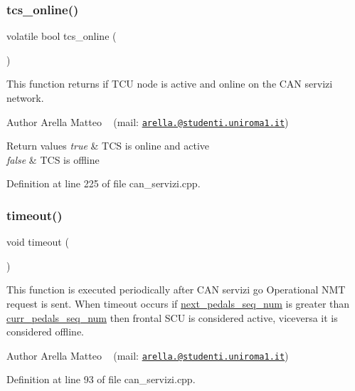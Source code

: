 \subsubsection{\texorpdfstring{tcs\+\_\+online()}{tcs\_online()}}
{\footnotesize\ttfamily volatile bool tcs\+\_\+online (\begin{DoxyParamCaption}{ }\end{DoxyParamCaption})}



This function returns if T\+CU node is active and online on the C\+AN servizi network. 

\begin{DoxyAuthor}{Author}
Arella Matteo ~\newline
 (mail\+: \href{mailto:arella.1646983@studenti.uniroma1.it}{\tt arella.@studenti.\+uniroma1.\+it})
\end{DoxyAuthor}

\begin{DoxyRetVals}{Return values}
{\em true} & T\+CS is online and active \\
\hline
{\em false} & T\+CS is offline \\
\hline
\end{DoxyRetVals}


Definition at line 225 of file can\+\_\+servizi.\+cpp.

\mbox{\label{group___c_a_n__servizi__group_gad446b5782bcb2d8ffc0aa1f8c4d16ded}} 
\subsubsection{\texorpdfstring{timeout()}{timeout()}}
{\footnotesize\ttfamily void timeout (\begin{DoxyParamCaption}{ }\end{DoxyParamCaption})}



This function is executed periodically after C\+AN servizi \textquotesingle{}go Operational\textquotesingle{} N\+MT request is sent. When timeout occurs if \mbox{\hyperlink{group___c_a_n__servizi__group_gadcbd4ad67b50cf61731266bf5c5ba158}{next\+\_\+pedals\+\_\+seq\+\_\+num}} is greater than \mbox{\hyperlink{group___c_a_n__servizi__group_gacad002b7cb06bffa8811859e6f53cb28}{curr\+\_\+pedals\+\_\+seq\+\_\+num}} then frontal S\+CU is considered active, viceversa it is considered offline. 

\begin{DoxyAuthor}{Author}
Arella Matteo ~\newline
 (mail\+: \href{mailto:arella.1646983@studenti.uniroma1.it}{\tt arella.@studenti.\+uniroma1.\+it}) 
\end{DoxyAuthor}


Definition at line 93 of file can\+\_\+servizi.\+cpp.

